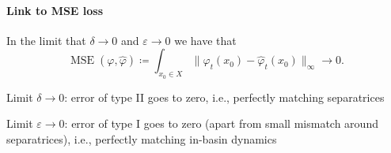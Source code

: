 \documentclass{article}
\theoremstyle{definition} \newtheorem{definition}{Definition}
\theoremstyle{remark} \newtheorem{remark}{Remark}
\newcounter{ct}
\begin{document}
\paragraph{Link to MSE loss}
In the limit that $\delta\rightarrow 0$ and $\varepsilon\rightarrow 0$  we have that 
\[\operatorname{MSE}(\varphi, \hat{\varphi}) \coloneqq \int_{x_0\in X} \|\varphi_t(x_0) - \hat{\varphi}_t(x_0)\|_\infty \rightarrow 0.\]


Limit $\delta\rightarrow 0$: error of type II goes to zero, i.e., perfectly matching separatrices


Limit $\varepsilon\rightarrow 0$: error of type I goes to zero (apart from small mismatch around separatrices), i.e., perfectly matching in-basin dynamics
\end{document}
